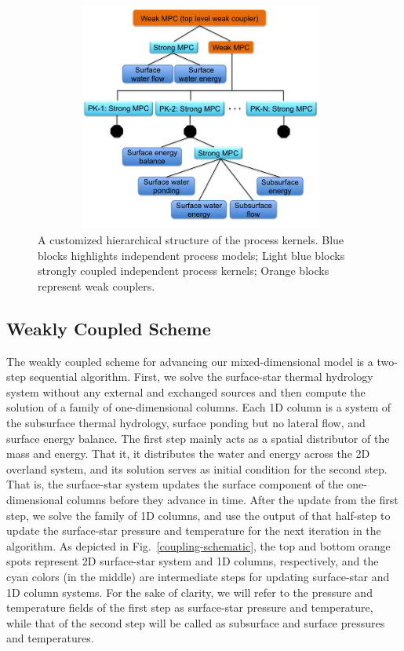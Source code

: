 \documentclass[review]{elsarticle}
\begin{document}
\begin{figure}[!htpb]
\centering
\includegraphics[height = 7.5cm, width=11cm]{figures/process-tree1.png}
\caption{A customized hierarchical structure of the process kernels. Blue blocks highlights independent process models; Light blue blocks strongly coupled independent process kernels; Orange blocks represent weak couplers.}
\label{pk-tree}
\end{figure}


\subsection{Weakly Coupled Scheme}
The weakly coupled scheme for advancing our mixed-dimensional model is a two-step sequential algorithm. First, we solve the surface-star thermal hydrology system without any external and exchanged sources and then compute the solution of a family of one-dimensional columns. Each 1D column is a system of the subsurface thermal hydrology, surface ponding but no lateral flow, and surface energy balance. The first step mainly acts as a spatial distributor of the mass and energy. That it, it distributes the water and energy across the 2D overland system, and its solution serves as initial condition for the second step. That is, the surface-star system updates the surface component of the one-dimensional columns before they advance in time. After the update from the first step, we solve the family of 1D columns, and use the output of that half-step to update the surface-star pressure and temperature for the next iteration in the algorithm. As depicted in Fig.~\ref{coupling-schematic}, the top and bottom orange spots represent 2D surface-star system and 1D columns, respectively, and the cyan colors (in the middle) are intermediate steps for updating surface-star and 1D column systems. For the sake of clarity, we will refer to the pressure and temperature fields of the first step as surface-star pressure and temperature, while that of the second step will be called as subsurface and surface pressures and temperatures.
\end{document}
